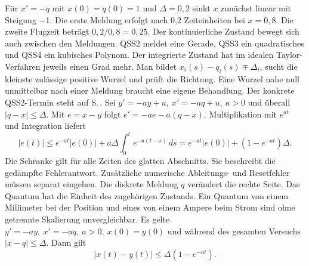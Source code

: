 \hypertarget{punkt6-2-1}{}
Für \(x'=-q\) mit \(x(0)=q(0)=1\) und \(\Delta=0{,}2\) sinkt \(x\) zunächst linear mit Steigung \ensuremath{-}1. Die erste Meldung erfolgt nach 0,2 Zeiteinheiten bei \(x=0{,}8\). Die zweite Flugzeit beträgt \(0{,}2/0{,}8=0{,}25\). Der kontinuierliche Zustand bewegt sich auch zwischen den Meldungen.
\hypertarget{punkt6-2-2}{}
QSS2 meldet eine Gerade, QSS3 ein quadratisches und QSS4 ein kubisches Polynom. Der integrierte Zustand hat im idealen Taylor-Verfahren jeweils einen Grad mehr. Man bildet \(x_i(s)-q_i(s)\mp\Delta_i\), sucht die kleinste zulässige positive Wurzel und prüft die Richtung. Eine Wurzel nahe null unmittelbar nach einer Meldung braucht eine eigene Behandlung. Der konkrete QSS2-Termin steht auf S.\,.
\hypertarget{punkt6-2-3}{}
Sei \(y'=-ay+u,\ x'=-aq+u,\ a>0\) und überall \(|q-x|\le\Delta\). Mit \(e=x-y\) folgt \(e'=-ae-a(q-x)\). Multiplikation mit \(e^{at}\) und Integration liefert
\[
 |e(t)|\le e^{-at}|e(0)|+a\Delta\int_0^te^{-a(t-s)}\,ds
 = e^{-at}|e(0)|+(1-e^{-at})\Delta .
\]
Die Schranke gilt für alle Zeiten des glatten Abschnitts. Sie beschreibt die gedämpfte Fehlerantwort. Zusätzliche numerische Ableitungs- und Resetfehler müssen separat eingehen.
Die diskrete Meldung \(q\) verändert die rechte Seite. Das Quantum hat die Einheit des zugehörigen Zustands. Ein Quantum von einem Millimeter bei der Position und eines von einem Ampere beim Strom sind ohne getrennte Skalierung unvergleichbar.
Es gelte \(y'=-ay,\ x'=-aq,\ a>0,\ x(0)=y(0)\) und während des gesamten Versuchs \(|x-q|\le\Delta\). Dann gilt
\[
 |x(t)-y(t)|\le\Delta(1-e^{-at}).
\]
